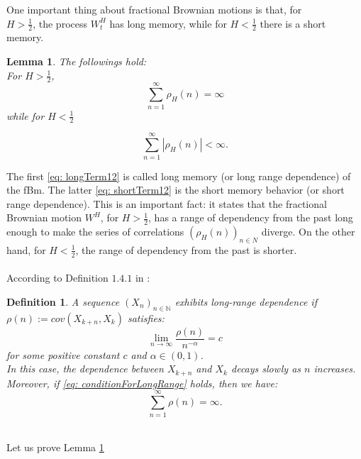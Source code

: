 \documentclass[a4paper,italian,11pt]{book}
\theoremstyle{plain}
\newtheorem{definition}{Definition}
\theoremstyle{remark}
\theoremstyle{plain}
\newtheorem{lemma}{Lemma}
\begin{document}
One important thing about fractional Brownian motions is that, for\\ $H>\frac{1}{2}$, the process $W^H_t$ has long memory, while for $H<\frac{1}{2}$ there is a short memory. \\
\begin{lemma}
\label{lemma: longandshortdependence} The followings hold: 
\\
\noindent
For $H>\frac{1}{2}$,
\begin{equation}
\label{eq: longTerm12}
    \sum_{n=1}^\infty \rho_H(n)=\infty
\end{equation}
\noindent
while for $H<\frac{1}{2}$

\begin{equation}
\label{eq: shortTerm12}
    \sum_{n=1}^\infty |\rho_H(n)|<\infty.
\end{equation}
\end{lemma}
The first \eqref{eq: longTerm12} is called long memory (or long range dependence) of the fBm. The latter \eqref{eq: shortTerm12} is the short memory behavior (or short range dependence).
This is an important fact: it states that the fractional Brownian motion $W^H$, for $H>\frac{1}{2}$, has a range of dependency from the past long enough to make the series of correlations $(\rho_H(n))_{n\in N}$ diverge. On the other hand, for $H<\frac{1}{2}$, the range of dependency from the past is shorter.
\\
\\
According to Definition $1.4.1$ in \cite{ZhangBook}: 
\begin{definition}
A sequence $(X_n)_{n\in \mathbb{N}}$ exhibits long-range dependence if $\rho(n) := cov(X_{k+n}, X_k)$ satisfies:
\begin{equation}
    \label{eq: conditionForLongRange}
    \lim_{n\to \infty} \frac{\rho(n)}{n^{-\alpha}} = c
\end{equation}
for some positive constant $c$ and $\alpha \in (0,1)$. 
\\
In this case, the dependence between $X_{k+n}$ and $X_k$ decays slowly as $n$ increases. Moreover, if \eqref{eq: conditionForLongRange} holds, then we have:
\begin{equation}
    \label{eq: divergenceForTestLong} 
    \sum_{n=1}^\infty \rho(n) =\infty.
\end{equation}
\end{definition}
\\
\noindent
Let us prove Lemma \ref{lemma: longandshortdependence} 
\end{document}
